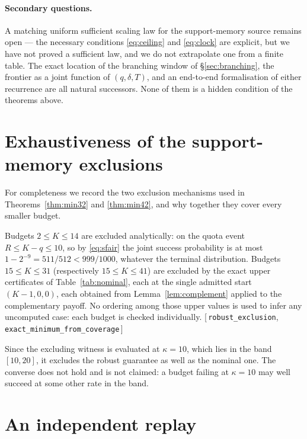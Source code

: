 \documentclass[11pt]{article}
\theoremstyle{plain}
\theoremstyle{definition}
\theoremstyle{remark}
\newcommand{\leanref}[1]{{\normalfont\sffamily\footnotesize[\,#1\,]}}
\begin{document}
\paragraph{Secondary questions.} A matching uniform sufficient scaling law for
the support-memory source remains open --- the necessary conditions
\eqref{eq:ceiling} and \eqref{eq:clock} are explicit, but we have not proved a
sufficient law, and we do not extrapolate one from a finite table. The exact
location of the branching window of \S\ref{sec:branching}, the frontier as a
joint function of $(q,\delta,T)$, and an end-to-end formalisation of either
recurrence are all natural successors. None of them is a hidden condition of
the theorems above.

\appendix

\section{Exhaustiveness of the support-memory exclusions}

For completeness we record the two exclusion mechanisms used in
Theorems~\ref{thm:min32} and \ref{thm:min42}, and why together they cover
every smaller budget.

Budgets $2\le K\le14$ are excluded analytically: on the quota event
$R\le K-q\le10$, so by \eqref{eq:sfair} the joint success probability is at
most $1-2^{-9}=511/512<999/1000$, whatever the terminal distribution.
Budgets $15\le K\le31$ (respectively $15\le K\le41$) are excluded by the exact
upper certificates of Table~\ref{tab:nominal}, each at the single admitted
start $(K-1,0,0)$, each obtained from Lemma~\ref{lem:complement} applied to
the complementary payoff. No ordering among those upper values is used to
infer any uncomputed case: each budget is checked individually.
\leanref{\texttt{robust\_exclusion}, \texttt{exact\_minimum\_from\_coverage}}

Since the excluding witness is evaluated at $\kappa=10$, which lies in the
band $[10,20]$, it excludes the robust guarantee as well as the nominal one.
The converse does not hold and is not claimed: a budget failing at
$\kappa=10$ may well succeed at some other rate in the band.

\section{An independent replay}\label{app:replay}
\end{document}
